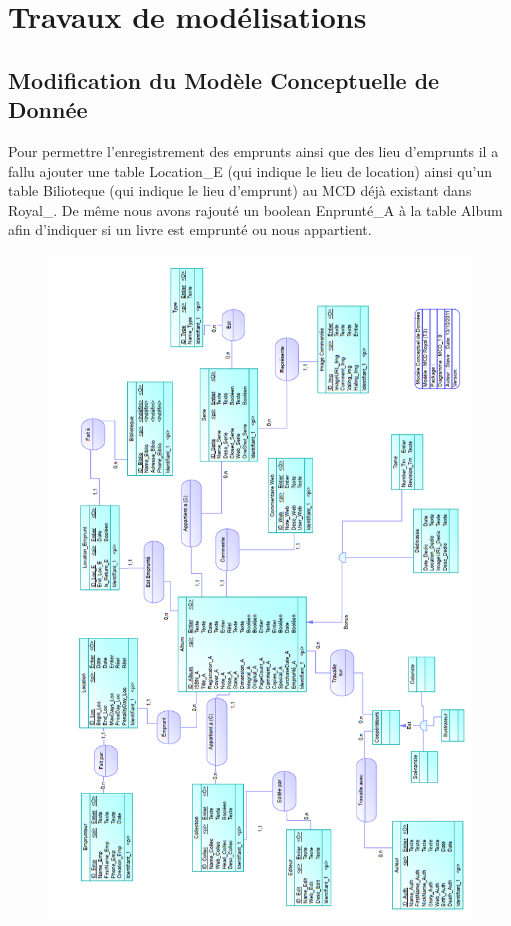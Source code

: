 \section{Travaux de modélisations} 
\subsection{Modification du Modèle Conceptuelle de Donnée}

Pour permettre l'enregistrement des emprunts ainsi que des lieu d'emprunts il a fallu ajouter une table Location\_E (qui indique le lieu de location) ainsi qu'un table Bilioteque (qui indique le lieu d'emprunt) au MCD déjà existant dans Royal\_.
De même nous avons rajouté un boolean Enprunté\_A à la table Album afin d'indiquer si un livre est emprunté ou nous appartient.

\begin{figure}
\includegraphics[width=13.5cm]{MCD_Royal_Modif.png}
\end{figure}
\clearpage{}

